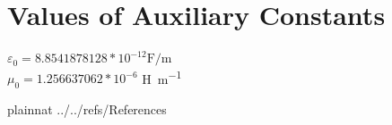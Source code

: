 \documentclass[12pt]{article}
\begin{document}



\section{Values of Auxiliary Constants}

$\varepsilon_{0} = 8.8541878128 * 10^{-12} \si{\farad\per \meter}$ 
\\
$\mu_{0} = 1.256637062 * 10^{-6}$ \si{\henry \per \meter}
\\

\newpage

 {plainnat}
 {../../refs/References}
\end{document}
